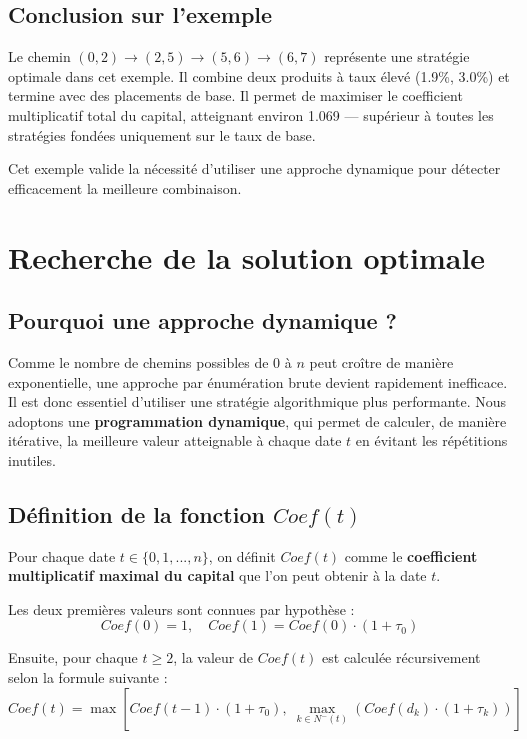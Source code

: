 \documentclass[a4paper,11pt]{article}
\begin{document}
    \subsection{Conclusion sur l’exemple}
    Le chemin $(0,2) \to (2,5) \to (5,6) \to (6,7)$ représente une stratégie optimale dans cet exemple. Il combine deux produits à taux élevé (1.9\%, 3.0\%) et termine avec des placements de base. Il permet de maximiser le coefficient multiplicatif total du capital, atteignant environ 1.069 — supérieur à toutes les stratégies fondées uniquement sur le taux de base.

    Cet exemple valide la nécessité d’utiliser une approche dynamique pour détecter efficacement la meilleure combinaison.



    \section{Recherche de la solution optimale}

\subsection{Pourquoi une approche dynamique ?}

Comme le nombre de chemins possibles de 0 à $n$ peut croître de manière exponentielle, une approche par énumération brute devient rapidement inefficace. Il est donc essentiel d’utiliser une stratégie algorithmique plus performante.  
Nous adoptons une \textbf{programmation dynamique}, qui permet de calculer, de manière itérative, la meilleure valeur atteignable à chaque date $t$ en évitant les répétitions inutiles.

\subsection{Définition de la fonction $Coef(t)$}

Pour chaque date $t \in \{0, 1, ..., n\}$, on définit $Coef(t)$ comme le \textbf{coefficient multiplicatif maximal du capital} que l’on peut obtenir à la date $t$.

Les deux premières valeurs sont connues par hypothèse :
\[
Coef(0) = 1, \quad Coef(1) = Coef(0) \cdot (1 + \tau_0)
\]

Ensuite, pour chaque $t \geq 2$, la valeur de $Coef(t)$ est calculée récursivement selon la formule suivante :
\[
Coef(t) = \max \left[
Coef(t-1) \cdot (1 + \tau_0), \;
\max_{k \in N^-(t)} \left( Coef(d_k) \cdot (1 + \tau_k) \right)
\right]
\]
\end{document}
